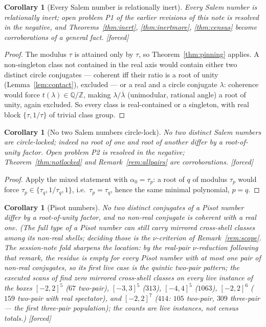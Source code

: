 \documentclass[11pt]{article}
\theoremstyle{plain}
\newtheorem{corollary}[theorem]{Corollary}
\theoremstyle{definition}
\theoremstyle{remark}
\newcommand{\Q}{\mathbb{Q}}
\newcommand{\Z}{\mathbb{Z}}
\newcommand{\F}{\textnormal{[forced]}}
\begin{document}
\begin{corollary}[Every Salem number is relationally inert]
\label{cor:allinert}
Every Salem number is relationally inert; open problem P1 of the earlier
revisions of this note is resolved in the negative, and
Theorems~\ref{thm:inert}, \ref{thm:inertmore}, \ref{thm:census} become
corroborations of a general fact. \F
\end{corollary}

\begin{proof}
The modulus $\tau$ is attained only by $\tau$, so
Theorem~\ref{thm:pinning} applies. A non-singleton class not contained in
the real axis would contain either two distinct circle conjugates ---
coherent iff their ratio is a root of unity (Lemma~\ref{lem:contact}),
excluded --- or a real and a circle conjugate $\lambda$: coherence would
force $t(\lambda)\in\Q/\Z$, making $\lambda/\overline{\lambda}$
(unimodular, rational angle) a root of unity, again excluded. So every
class is real-contained or a singleton, with real block $\{\tau,1/\tau\}$
of trivial class group.
\end{proof}

\begin{corollary}[No two Salem numbers circle-lock]\label{cor:nolock}
No two distinct Salem numbers are circle-locked; indeed no root of one and
root of another differ by a root-of-unity factor. Open problem P2 is
resolved in the negative; Theorem~\ref{thm:notlocked} and
Remark~\ref{rem:allpairs} are corroborations. \F
\end{corollary}

\begin{proof}
Apply the mixed statement with $\alpha_0=\tau_p$: a root of $q$ of modulus
$\tau_p$ would force $\tau_p\in\{\tau_q,1/\tau_q,1\}$, i.e.\
$\tau_p=\tau_q$, hence the same minimal polynomial, $p=q$.
\end{proof}

\begin{corollary}[Pisot numbers]\label{cor:pisot}
No two distinct conjugates of a Pisot number differ by a root-of-unity
factor, and no non-real conjugate is coherent with a real one. (The full
type of a Pisot number can still carry mirrored cross-shell classes among
its non-real shells; deciding those is the $\nu$-criterion of
Remark~\ref{rem:scope}. The session-note fold sharpens the location: by the
real-pair $\nu$-reduction following that remark, the residue is empty for every
Pisot number with at most one pair of non-real conjugates, so its first
live case is the quintic two-pair pattern; the executed scans of
\cite{pisotnote} find \emph{zero} mirrored cross-shell classes on every
live instance of the boxes $[-2,2]^5$ ($67$ two-pair), $[-3,3]^5$ ($313$),
$[-4,4]^5$ ($1063$), $[-2,2]^6$ ($159$ two-pair with real spectator), and
$[-2,2]^7$ ($414$: $105$ two-pair, $309$ three-pair --- the first
three-pair population); the counts are live instances, not census
totals.) \F
\end{corollary}
\end{document}
